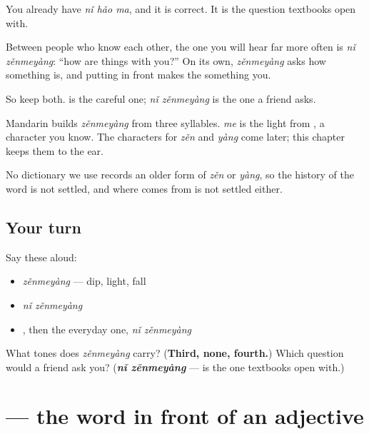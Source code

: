 \begin{culture}
You already have \textbf{} \emph{nǐ hǎo ma}, and it is correct. It is the question textbooks open with.

Between people who know each other, the one you will hear far more often is \emph{nǐ zěnmeyàng}: \textquotedblleft{}how are things with you?\textquotedblright{} On its own, \emph{zěnmeyàng} asks how something is, and putting  in front makes the something you.

So keep both.  is the careful one; \emph{nǐ zěnmeyàng} is the one a friend asks.
\end{culture}

\begin{cousinweb}
Mandarin builds \emph{zěnmeyàng} from three syllables. \emph{me} is the light  from , a character you know. The characters for \emph{zěn} and \emph{yàng} come later; this chapter keeps them to the ear.

No dictionary we use records an older form of \emph{zěn} or \emph{yàng}, so the history of the word is not settled, and where  comes from is not settled either.
\end{cousinweb}

\subsection*{Your turn}
Say these aloud:

\begin{itemize}
\raggedright
  \item \emph{zěnmeyàng} — dip, light, fall
  \item \emph{nǐ zěnmeyàng}
  \item {}, then the everyday one, \emph{nǐ zěnmeyàng}
\end{itemize}

\begin{tcolorbox}[breakable,colback=teal!4,colframe=teal!35!black,title={Before you move on}]
What tones does \emph{zěnmeyàng} carry? (\textbf{Third, none, fourth.}) Which question would a friend ask you? (\emph{\textbf{nǐ zěnmeyàng}} —  is the one textbooks open with.)
\end{tcolorbox}
\section[\texorpdfstring{\zh{很} (hěn)}{很 (hěn)}]{ — the word in front of an adjective}

